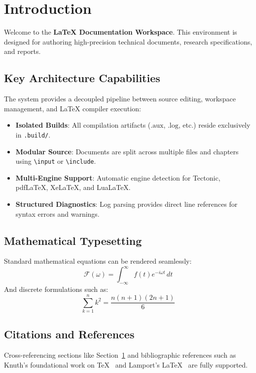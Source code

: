 \section{Introduction}
\label{sec:intro}

Welcome to the \textbf{LaTeX Documentation Workspace}. This environment is designed for authoring high-precision technical documents, research specifications, and reports.

\subsection{Key Architecture Capabilities}
The system provides a decoupled pipeline between source editing, workspace management, and LaTeX compiler execution:
\begin{itemize}
    \item \textbf{Isolated Builds}: All compilation artifacts ($\text{.aux}$, $\text{.log}$, etc.) reside exclusively in \texttt{.build/}.
    \item \textbf{Modular Source}: Documents are split across multiple files and chapters using \texttt{\textbackslash input} or \texttt{\textbackslash include}.
    \item \textbf{Multi-Engine Support}: Automatic engine detection for Tectonic, pdfLaTeX, XeLaTeX, and LuaLaTeX.
    \item \textbf{Structured Diagnostics}: Log parsing provides direct line references for syntax errors and warnings.
\end{itemize}

\subsection{Mathematical Typesetting}
Standard mathematical equations can be rendered seamlessly:
\begin{equation}
    \mathcal{F}(\omega) = \int_{-\infty}^{\infty} f(t) e^{-i\omega t} \, dt
\end{equation}
And discrete formulations such as:
\begin{equation}
    \sum_{k=1}^{n} k^2 = \frac{n(n+1)(2n+1)}{6}
\end{equation}

\subsection{Citations and References}
Cross-referencing sections like Section~\ref{sec:intro} and bibliographic references such as Knuth's foundational work on \TeX~\cite{knuth1984texbook} and Lamport's \LaTeX~\cite{lamport1994latex} are fully supported.
